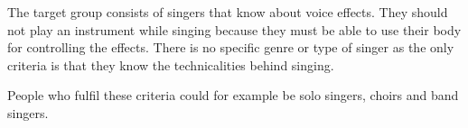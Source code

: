 The target group consists of singers that know about voice effects. They should not play an instrument while singing because they must be able to use their body for controlling the effects. There is no specific genre or type of singer as the only criteria is that they know the technicalities behind singing.

People who fulfil these criteria could for example be solo singers, choirs and band singers.